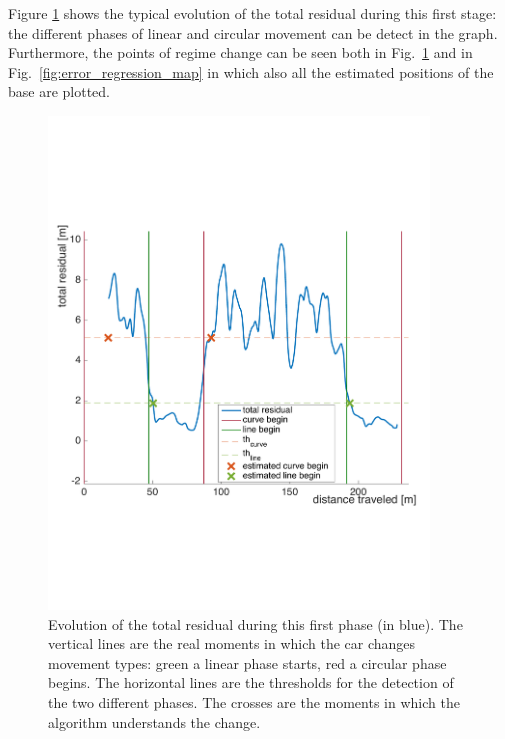 Figure \ref{fig:error_regression} shows the typical evolution of the total residual during this first stage: the different phases of linear and circular movement can be detect in the graph. Furthermore, the points of regime change can be seen both in Fig.~\ref{fig:error_regression}  and in Fig.~\ref{fig:error_regression_map} in which also all the estimated positions of the base are plotted.

\begin{figure}[!htbp]
    \centering
    \includegraphics[width=0.9\textwidth]{img/following_platform_for_long_position_base_error.pdf}
    \caption{Evolution of the total residual during this first phase (in blue). The vertical lines are the real moments in which the car changes movement types: green a linear phase starts, red a circular phase begins. The horizontal lines are the thresholds for the detection of the two different phases. The crosses are the moments in which the algorithm understands the change.}
    \label{fig:error_regression}
\end{figure}
